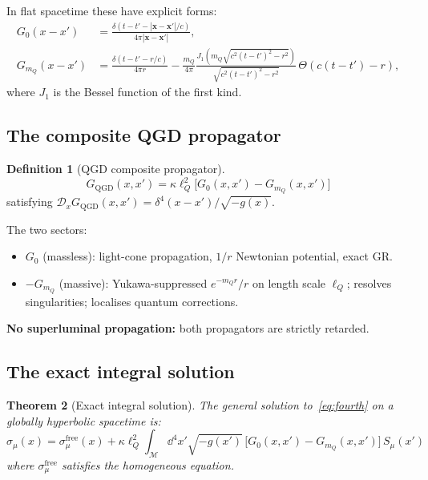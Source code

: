 \documentclass[11pt,a4paper]{article}
\theoremstyle{plain}
\newtheorem{theorem}{Theorem}[section]
\theoremstyle{definition}
\newtheorem{definition}[theorem]{Definition}
\theoremstyle{remark}
\newcommand{\lQ}{\ell_Q}
\newcommand{\mQ}{m_Q}
\begin{document}
In flat spacetime these have explicit forms:
\begin{align}
  G_0(x-x') &= \frac{\delta(t-t'-|\mathbf{x}-\mathbf{x}'|/c)}{4\pi|\mathbf{x}-\mathbf{x}'|},
    \label{eq:G0flat}\\
  G_{\mQ}(x-x') &= \frac{\delta(t-t'-r/c)}{4\pi r}
    - \frac{\mQ}{4\pi}\frac{J_1\!\left(\mQ\sqrt{c^2(t-t')^2-r^2}\right)}
          {\sqrt{c^2(t-t')^2-r^2}}\,\Theta(c(t-t')-r),
    \label{eq:GmQflat}
\end{align}
where $J_1$ is the Bessel function of the first kind.

\subsection{The composite QGD propagator}

\begin{definition}[QGD composite propagator]
\begin{equation}
  G_{\mathrm{QGD}}(x,x') = \kappa\lQ^2\bigl[G_0(x,x') - G_{\mQ}(x,x')\bigr]
  \label{eq:GQGD}
\end{equation}
satisfying $\mathcal{D}_x G_{\mathrm{QGD}}(x,x') = \delta^4(x-x')/\sqrt{-g(x)}$.
\end{definition}

The two sectors:
\begin{itemize}[nosep]
  \item $G_0$ (massless): light-cone propagation, $1/r$ Newtonian potential, exact GR.
  \item $-G_{\mQ}$ (massive): Yukawa-suppressed $e^{-\mQ r}/r$ on length scale $\lQ$;
    resolves singularities; localises quantum corrections.
\end{itemize}

\textbf{No superluminal propagation:} both propagators are strictly retarded.

\subsection{The exact integral solution}

\begin{theorem}[Exact integral solution]
\label{thm:exact}
The general solution to~\eqref{eq:fourth} on a globally hyperbolic spacetime is:
\begin{equation}
  \boxed{\sigma_\mu(x) = \sigma_\mu^{\mathrm{free}}(x)
    + \kappa\lQ^2\!\int_{\mathcal{M}}\!\dd^4x'\sqrt{-g(x')}\,
      \bigl[G_0(x,x') - G_{\mQ}(x,x')\bigr]\,S_\mu(x')}
  \label{eq:exact}
\end{equation}
where $\sigma_\mu^{\mathrm{free}}$ satisfies the homogeneous equation.
\end{theorem}
\end{document}
